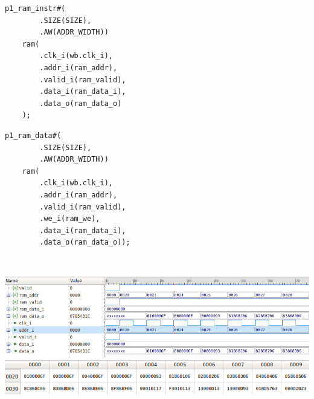 \documentclass[11pt,a4paper]{article}
\begin{document}
\begin{minipage}{.49\textwidth}
\begin{scriptsize}
\begin{lstlisting}[label=Lis:ram_1p_in,caption=Instancja pamięci instrukcji]
    p1_ram_instr#(
        .SIZE(SIZE),
        .AW(ADDR_WIDTH))
    ram(
        .clk_i(wb.clk_i),
        .addr_i(ram_addr),
        .valid_i(ram_valid),
        .data_i(ram_data_i),
        .data_o(ram_data_o)
    );
\end{lstlisting}
\end{scriptsize}
\end{minipage} \hspace{.02\textwidth}
\begin{minipage}{.49\textwidth}
\begin{scriptsize}
\begin{lstlisting}[label=Lis:ram_1p_data,caption=Instancja pamięci danych]
    p1_ram_data#(
        .SIZE(SIZE),
        .AW(ADDR_WIDTH))
    ram(
        .clk_i(wb.clk_i),
        .addr_i(ram_addr),
        .valid_i(ram_valid),
        .we_i(ram_we),
        .data_i(ram_data_i),
        .data_o(ram_data_o));
\end{lstlisting}
\end{scriptsize}
\end{minipage}\\
					\begin{minipage}[c]{\textwidth}

					\includegraphics[width=15cm]{./rysunki/ram_sim.png}
					\includegraphics[width=15cm]{./rysunki/pamiec_ram.png}

			\end{minipage} 
\end{document}
